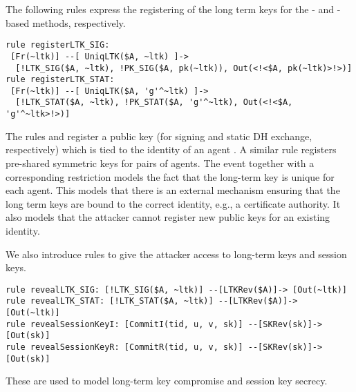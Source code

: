The following rules express the registering of the long term keys for the
\mSig{}- and \mStat{}-based methods, respectively.
%
\begin{lstlisting}
rule registerLTK_SIG:
 [Fr(~ltk)] --[ UniqLTK($A, ~ltk) ]->
  [!LTK_SIG($A, ~ltk), !PK_SIG($A, pk(~ltk)), Out(<!<$A, pk(~ltk)>!>)]
rule registerLTK_STAT:
 [Fr(~ltk)] --[ UniqLTK($A, 'g'^~ltk) ]->
  [!LTK_STAT($A, ~ltk), !PK_STAT($A, 'g'^~ltk), Out(<!<$A, 'g'^~ltk>!>)]
\end{lstlisting}
%
The rules  and  register a public key
(for signing and static DH exchange, respectively) which is tied to the
identity of an agent \mbox{.}
%
A similar rule  registers pre-shared symmetric keys for
pairs of agents.
%
The event  together with a corresponding restriction models the fact that
the long-term key is unique for each agent.
This models that there is an external mechanism ensuring that the
long term keys are bound to the correct identity, e.g., a certificate authority.
%
It also models that the attacker cannot register new public keys for an
existing identity.
%

We also introduce rules to give the attacker access to
long-term keys and session keys.
%
\begin{lstlisting}
rule revealLTK_SIG: [!LTK_SIG($A, ~ltk)] --[LTKRev($A)]-> [Out(~ltk)]
rule revealLTK_STAT: [!LTK_STAT($A, ~ltk)] --[LTKRev($A)]-> [Out(~ltk)]
rule revealSessionKeyI: [CommitI(tid, u, v, sk)] --[SKRev(sk)]-> [Out(sk)]
rule revealSessionKeyR: [CommitR(tid, u, v, sk)] --[SKRev(sk)]-> [Out(sk)]
\end{lstlisting}
%
These are used to model long-term key compromise and session key secrecy.
\\

